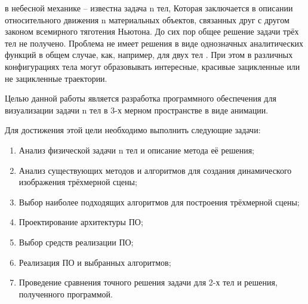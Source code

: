 
в небесной механике – известна задача n тел, Которая заключается в описании относительного движения n материальных объектов, связанных друг с другом законом всемирного тяготения Ньютона. До сих пор общее решение задачи трёх тел не получено.
Проблема не имеет решения в виде однозначных аналитических функций в общем случае, как, например, для двух тел \cite{solution3}. При этом в различных конфигурациях тела могут образовывать интересные, красивые зацикленные или не зацикленные траектории.

Целью данной работы является разработка программного обеспечения для визуализации задачи n тел в 3-х мерном пространстве в виде анимации.

Для достижения этой цели необходимо выполнить следующие задачи:

\begin{enumerate}
	\item Анализ физической задачи n тел и описание метода её решения;
	\item Анализ существующих методов и алгоритмов для создания динамического изображения трёхмерной сцены;
	\item Выбор наиболее подходящих алгоритмов для построения трёхмерной сцены;
	\item Проектирование архитектуры ПО;
	\item Выбор средств реализации ПО;
	\item Реализация ПО и выбранных алгоритмов;
	\item Проведение сравнения точного решения задачи для 2-х тел и решения, полученного программой.
\end{enumerate}

\clearpage
